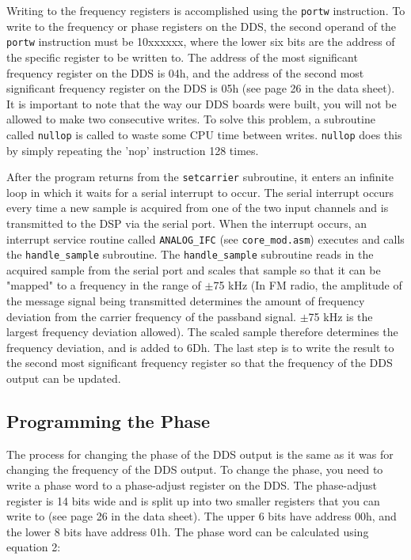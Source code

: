 Writing to the frequency registers is accomplished using the \verb+portw+ instruction.  To write
 to the frequency or phase registers on the DDS, the second operand of the \verb+portw+ instruction
 must be 10xxxxxx, where the lower six bits are the address of the specific register to be 
written to.  The address of the most significant frequency register on the DDS is 04h, and 
the address of the second most significant frequency register on the DDS is 05h (see page 26 
in the data sheet).  It is important to note that the way our DDS boards were built, you will not 
be allowed to make two consecutive writes.  To solve this problem, a subroutine called 
\verb+nullop+ is called to waste some CPU time between writes.  \verb+nullop+ does this by simply repeating 
the 'nop' instruction 128 times.  

After the program returns from the \verb+setcarrier+ subroutine, it enters an infinite loop in which 
it waits for a serial interrupt to occur.  The serial interrupt occurs every time a 
new sample is acquired from one of the two input channels and is transmitted to the DSP via the serial port.  
When the interrupt occurs, an interrupt service routine called \verb+ANALOG_IFC+ 
(see \verb+core_mod.asm+) executes and calls the \verb+handle_sample+ subroutine.  The 
\verb+handle_sample+ subroutine 
reads in the acquired sample from the serial port and scales that sample so that it can
 be "mapped" to a frequency in the range of $\pm$75 kHz (In FM radio, the amplitude of the message 
signal being transmitted determines the amount of frequency deviation from the carrier frequency 
of the passband signal.  $\pm$75 kHz is the largest frequency deviation allowed).  The scaled sample 
therefore determines the frequency deviation, and is added to 6Dh.  The last step is to write the 
result to the second most significant frequency register so that the frequency of the DDS output 
can be updated.       

\subsection{Programming the Phase}
The process for changing the phase of the DDS output is the same as it was for changing the 
frequency of the DDS output.  To change the phase, you need to write a phase word to a phase-adjust
 register on the DDS.  The phase-adjust register is 14 bits wide and is split up into
 two smaller registers that you can write to (see page 26 in the data sheet).  The upper 6 bits 
have address 00h, and the lower 8 bits have address 01h.  The phase word can be calculated 
using equation 2:


